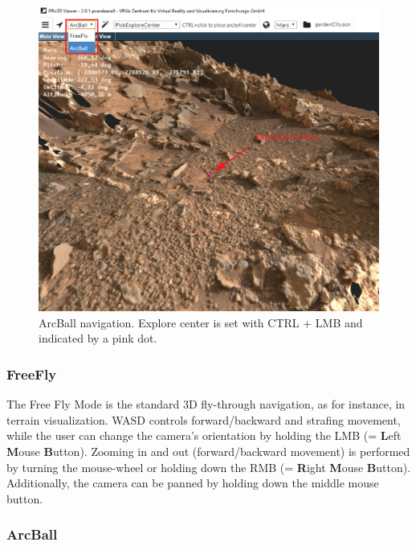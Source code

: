 \begin{figure}[h]
    	\centering
    		\includegraphics[width=1\textwidth]{pics/exploreCenterAI.png}
    	\caption[ExploreCenter]{ArcBall navigation. Explore center is set with CTRL + LMB and indicated by a pink dot.}
    	\label{fig:exploreCenter}
   \end{figure}

\subsubsection{FreeFly}

The Free Fly Mode is the standard 3D fly-through navigation, as for instance, in terrain visualization. WASD controls forward/backward and strafing movement, while the user can change the camera's orientation by holding the LMB (= \textbf{L}eft \textbf{M}ouse \textbf{B}utton). Zooming in and out (forward/backward movement) is performed by turning the mouse-wheel or holding down the RMB (= \textbf{R}ight \textbf{M}ouse \textbf{B}utton). Additionally, the camera can be panned by holding down the middle mouse button.

\subsubsection{ArcBall}

